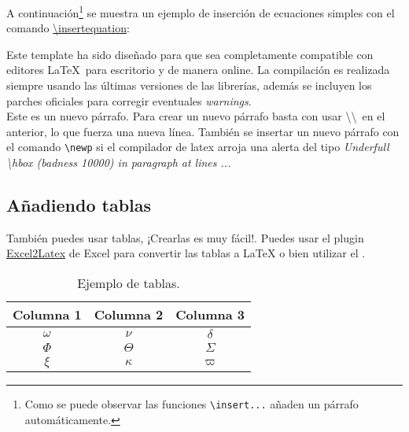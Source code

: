	A continuación\footnote{Como se puede observar las funciones \texttt{\textbackslash insert...} añaden un párrafo automáticamente.} se muestra un ejemplo de inserción de ecuaciones simples con el comando \href{https://latex.ppizarror.com/informe.html#hlp-formulae}{\textbackslash insertequation}:


	Este template ha sido diseñado para que sea completamente compatible con editores \LaTeX\ para escritorio y de manera online. La compilación es realizada siempre usando las últimas versiones de las librerías, además se incluyen los parches oficiales para corregir eventuales \textit{warnings}. \\

	Este es un nuevo párrafo. Para crear un nuevo párrafo basta con usar \textbackslash\textbackslash\ en el anterior, lo que fuerza una nueva línea. También se insertar un nuevo párrafo con el comando \texttt{\textbackslash newp} si el compilador de latex arroja una alerta del tipo \textit{Underfull \textbackslash hbox (badness 10000) in paragraph at lines ...}

\subsection{Añadiendo tablas}

	También puedes usar tablas, ¡Crearlas es muy fácil!. Puedes usar el plugin \href{https://www.ctan.org/tex-archive/support/excel2latex}{Excel2Latex} \cite{excel2latex} de Excel para convertir las tablas a \LaTeX\xspace o bien utilizar el  \cite{tablesgenerator}.

	\begin{table}[H]
		\centering
		\caption{Ejemplo de tablas.}
		\begin{tabular}{ccc}
			\hline
			\textbf{Columna 1} & \textbf{Columna 2} & \textbf{Columna 3} \bigstrut\\
			\hline
			$\omega$ & $\nu$ & $\delta$ \bigstrut[t]\\
			$\Phi$ & $\Theta$ & $\varSigma$ \\
			$\xi$ & $\kappa$ & $\varpi$ \bigstrut[b] \\
			\hline
		\end{tabular}
		\label{tab:tabla-1}
	\end{table}



